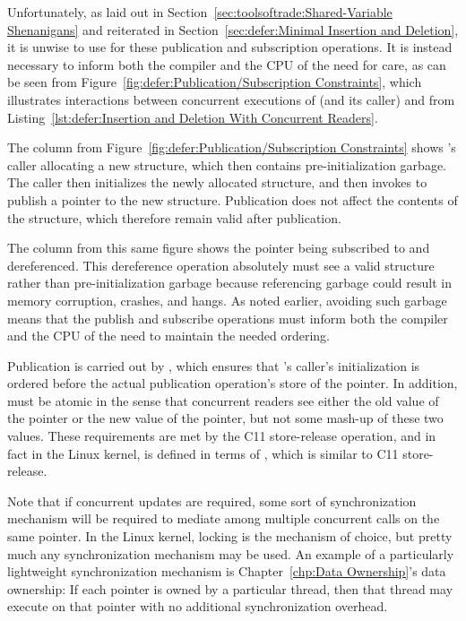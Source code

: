 Unfortunately, as laid out in
Section~\ref{sec:toolsoftrade:Shared-Variable Shenanigans}
and reiterated in
Section~\ref{sec:defer:Minimal Insertion and Deletion},
it is unwise to use 
for these publication and subscription operations.
It is instead necessary to inform both the compiler and the CPU
of the need for care, as can be seen from
Figure~\ref{fig:defer:Publication/Subscription Constraints},
which illustrates interactions between concurrent executions of
 (and its caller) and  from
Listing~\ref{lst:defer:Insertion and Deletion With Concurrent Readers}.

The  column from
Figure~\ref{fig:defer:Publication/Subscription Constraints}
shows 's caller allocating a new  structure,
which then contains pre-initialization garbage.
The caller then initializes the newly allocated structure, and then
invokes  to publish a pointer to the new 
structure.
Publication does not affect the contents of the structure, which
therefore remain valid after publication.

The  column from this same figure shows
the pointer being subscribed to and dereferenced.
This dereference operation absolutely must see a valid 
structure rather than pre-initialization garbage because referencing
garbage could result in memory corruption, crashes, and hangs.
As noted earlier, avoiding such garbage means that the publish and
subscribe operations must inform both the compiler and the CPU of the
need to maintain the needed ordering.

Publication is carried out by , which ensures that
's caller's initialization is ordered before the actual
publication operation's store of the pointer.
In addition,  must be atomic in the sense that 
concurrent readers see either the old value of the pointer or the new
value of the pointer, but not some mash-up of these two values.
These requirements are met by the C11 store-release operation, and in
fact in the Linux kernel,  is defined in terms
of , which is similar to C11 store-release.

Note that if concurrent updates are required, some sort of synchronization
mechanism will be required to mediate among multiple concurrent
 calls on the same pointer.
In the Linux kernel, locking is the mechanism of choice, but pretty
much any synchronization mechanism may be used.
An example of a particularly lightweight synchronization mechanism is
Chapter~\ref{chp:Data Ownership}'s data ownership: If each pointer is
owned by a particular thread, then that thread may execute
 on that pointer with no additional
synchronization overhead.

